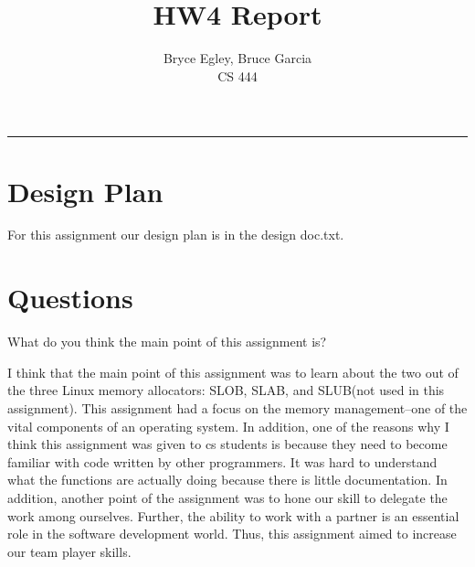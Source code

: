 \documentclass{article}
\newenvironment{question}[2][Question]{\begin{trivlist}
\item[\hskip \labelsep {\bfseries #1}\hskip \labelsep {\bfseries #2.}]}{\end{trivlist}}
\begin{document}

\title{HW4 Report} %
\author{Bryce Egley, Bruce Garcia\\CS 444} %

\maketitle
\hrule


%
%

\section*{Design Plan}
For this assignment our design plan is in the design doc.txt.
\newline


\section*{Questions}

\begin{question}{1}
What do you think the main point of this assignment is?
\end{question}
I think that the main point of this assignment was to learn about the two out of the three Linux memory allocators: SLOB, SLAB, and SLUB(not used in this assignment). This assignment had a focus on the memory management--one of the vital components of an operating system. In addition, one of the reasons why I think this assignment was given to cs students is because they need to become familiar with code written by other programmers. It was hard to understand what the functions are actually doing because there is little documentation. In addition, another point of the assignment was to hone our skill to delegate the work among ourselves. Further, the ability to work with a partner is an essential role in the software development world. Thus, this assignment aimed to increase our team player skills.
\end{document}
